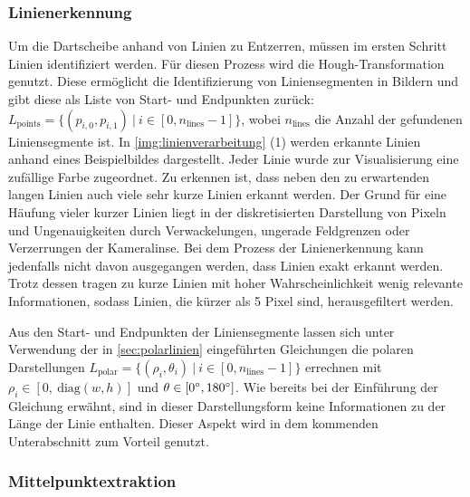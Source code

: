 \subsubsection{Linienerkennung}
\label{sec:linienerkennung}

Um die Dartscheibe anhand von Linien zu Entzerren, müssen im ersten Schritt Linien identifiziert werden. Für diesen Prozess wird die Hough-Transformation genutzt. Diese ermöglicht die Identifizierung von Liniensegmenten in Bildern und gibt diese als Liste von Start- und Endpunkten zurück: $L_\text{points} = \{(p_{i, 0}, p_{i, 1})\ \vert \ i \in [0, n_\text{lines}-1]\}$, wobei $n_\text{lines}$ die Anzahl der gefundenen Liniensegmente ist. In \autoref{img:linienverarbeitung} (1) werden erkannte Linien anhand eines Beispielbildes dargestellt. Jeder Linie wurde zur Visualisierung eine zufällige Farbe zugeordnet. Zu erkennen ist, dass neben den zu erwartenden langen Linien auch viele sehr kurze Linien erkannt werden. Der Grund für eine Häufung vieler kurzer Linien liegt in der diskretisierten Darstellung von Pixeln und Ungenauigkeiten durch Verwackelungen, ungerade Feldgrenzen oder Verzerrungen der Kameralinse. Bei dem Prozess der Linienerkennung kann jedenfalls nicht davon ausgegangen werden, dass Linien exakt erkannt werden. Trotz dessen tragen zu kurze Linien mit hoher Wahrscheinlichkeit wenig relevante Informationen, sodass Linien, die kürzer als 5 Pixel sind, herausgefiltert werden.

Aus den Start- und Endpunkten der Liniensegmente lassen sich unter Verwendung der in \autoref{sec:polarlinien} eingeführten Gleichungen die polaren Darstellungen $L_\text{polar} = \{(\rho_i, \theta_i)\ |\ i \in [0, n_\text{lines}-1]\}$ errechnen mit $\rho_i \in [0,\ \text{diag}(w, h)]$ und $\theta \in [0^{\circ}, 180^{\circ}]$. Wie bereits bei der Einführung der Gleichung erwähnt, sind in dieser Darstellungsform keine Informationen zu der Länge der Linie enthalten. Dieser Aspekt wird in dem kommenden Unterabschnitt zum Vorteil genutzt.

\subsubsection{Mittelpunktextraktion}
\label{sec:mittelpunktextraktion}

